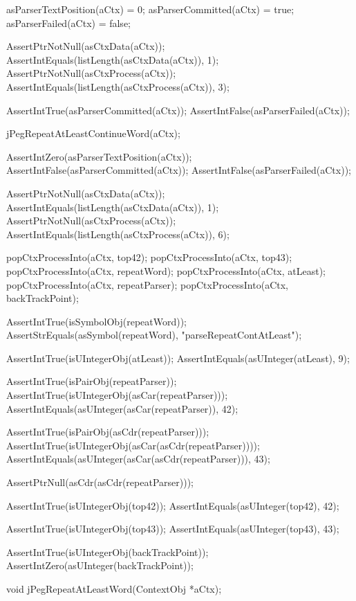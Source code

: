   asParserTextPosition(aCtx) = 0;
  asParserCommitted(aCtx)    = true;
  asParserFailed(aCtx)       = false;
  
  AssertPtrNotNull(asCtxData(aCtx));
  AssertIntEquals(listLength(asCtxData(aCtx)), 1);
  AssertPtrNotNull(asCtxProcess(aCtx));
  AssertIntEquals(listLength(asCtxProcess(aCtx)), 3);
  
  AssertIntTrue(asParserCommitted(aCtx));
  AssertIntFalse(asParserFailed(aCtx));
  
  jPegRepeatAtLeastContinueWord(aCtx);
  
  AssertIntZero(asParserTextPosition(aCtx));
  AssertIntFalse(asParserCommitted(aCtx));
  AssertIntFalse(asParserFailed(aCtx));
  
  AssertPtrNotNull(asCtxData(aCtx));
  AssertIntEquals(listLength(asCtxData(aCtx)), 1);
  AssertPtrNotNull(asCtxProcess(aCtx));
  AssertIntEquals(listLength(asCtxProcess(aCtx)), 6);
  
  popCtxProcessInto(aCtx, top42);
  popCtxProcessInto(aCtx, top43);
  popCtxProcessInto(aCtx, repeatWord);
  popCtxProcessInto(aCtx, atLeast);
  popCtxProcessInto(aCtx, repeatParser);
  popCtxProcessInto(aCtx, backTrackPoint);
  
  AssertIntTrue(isSymbolObj(repeatWord));
  AssertStrEquals(asSymbol(repeatWord), "parseRepeatContAtLeast");
  
  AssertIntTrue(isUIntegerObj(atLeast));
  AssertIntEquals(asUInteger(atLeast), 9);
  
  AssertIntTrue(isPairObj(repeatParser));
  AssertIntTrue(isUIntegerObj(asCar(repeatParser)));
  AssertIntEquals(asUInteger(asCar(repeatParser)), 42);
  
  AssertIntTrue(isPairObj(asCdr(repeatParser)));
  AssertIntTrue(isUIntegerObj(asCar(asCdr(repeatParser))));
  AssertIntEquals(asUInteger(asCar(asCdr(repeatParser))), 43);
  
  AssertPtrNull(asCdr(asCdr(repeatParser)));
  
  AssertIntTrue(isUIntegerObj(top42));
  AssertIntEquals(asUInteger(top42), 42);  

  AssertIntTrue(isUIntegerObj(top43));
  AssertIntEquals(asUInteger(top43), 43);
  
  AssertIntTrue(isUIntegerObj(backTrackPoint));
  AssertIntZero(asUInteger(backTrackPoint));
\stopCTest
\stopTestCase
\stopTestSuite

\startTestSuite[jPegRepeatAtLeastWord]

\startCHeader
void jPegRepeatAtLeastWord(ContextObj *aCtx);
\stopCHeader

